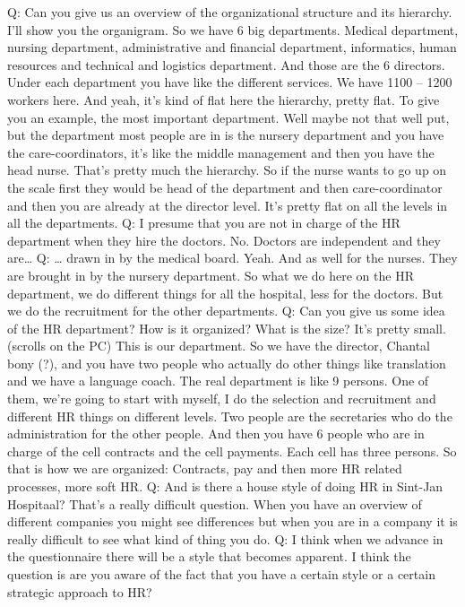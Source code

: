 \documentclass[a4paper,fleqn,11pt,dvips,titlepage]{article}
\numberwithin{figure}{section}
\numberwithin{equation}{section}
\begin{document}
Q: Can you give us an overview of the organizational structure and its hierarchy. 
I’ll show you the organigram. So we have 6 big departments. Medical department, nursing department, administrative and financial department, informatics, human resources and technical and logistics department. And those are the 6 directors. Under each department you have like the different services. We have 1100 – 1200 workers here. And yeah, it’s kind of flat here the hierarchy, pretty flat. To give you an example, the most important department. Well maybe not that well put, but the department most people are in is the nursery department and you have the care-coordinators, it’s like the middle management and then you have the head nurse. That’s pretty much the hierarchy. So if the nurse wants to go up on the scale first they would be head of the department and then care-coordinator and then you are already at the director level. It’s pretty flat on all the levels in all the departments.  
Q: I presume that you are not in charge of the HR department when they hire the doctors.
No. Doctors are independent and they are…
Q: … drawn in by the medical board. 
Yeah. And as well for the nurses. They are brought in by the nursery department. So what we do here on the HR department, we do different things for all the hospital, less for the doctors. But we do the recruitment for the other departments. 
Q: Can you give us some idea of the HR department? How is it organized? What is the size? 
It’s pretty small. (scrolls on the PC) This is our department. So we have the director, Chantal bony (?), and you have two people who actually do other things like translation and we have a language coach. The real department is like 9 persons. One of them, we’re going to start with myself, I do the selection and recruitment and different HR things on different levels. Two people are the secretaries who do the administration for the other people. And then you have 6 people who are in charge of the cell contracts and the cell payments. Each cell has three persons. So that is how we are organized: Contracts, pay and then more HR related processes, more soft HR.  
Q: And is there a house style of doing HR in Sint-Jan Hospitaal?
That’s a really difficult question. When you have an overview of different companies you might see differences but when you are in a company it is really difficult to see what kind of thing you do. 
Q: I think when we advance in the questionnaire there will be a style that becomes apparent. I think the question is are you aware of the fact that you have a certain style or a certain strategic approach to HR? 
\end{document}
